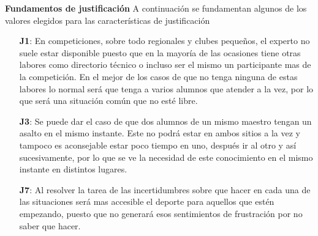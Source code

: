 \textbf{Fundamentos de justificación}
A continuación se fundamentan algunos de los valores elegidos para las características de justificación

\begin{enumerate}
  \item[\textbf{J1}:] En competiciones, sobre todo regionales y clubes pequeños, el experto
     no suele estar disponible puesto que en la mayoría de las ocasiones tiene otras labores
     como directorio técnico o incluso ser el mismo un participante mas de la competición.
     En el mejor de los casos de que no tenga ninguna de estas labores lo normal será que
     tenga a varios alumnos que atender a la vez, por lo que será una situación común que no esté libre.
  \item[\textbf{J3}:] Se puede dar el caso de que dos alumnos de un mismo maestro tengan un
     asalto en el mismo instante. Este no podrá estar en ambos sitios a la vez y tampoco es
     aconsejable estar poco tiempo en uno, después ir al otro y así sucesivamente, por lo que
     se ve la necesidad de este conocimiento en el mismo instante en distintos lugares.
  \item[\textbf{J7}:] Al resolver la tarea de las incertidumbres sobre que hacer
     en cada una de las situaciones será mas accesible el deporte para aquellos que estén
     empezando, puesto que no generará esos sentimientos de frustración por no saber que hacer.
\end{enumerate}

